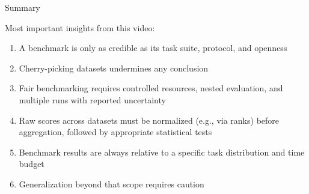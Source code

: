 \documentclass[main]{subfiles}
\begin{document}
\begin{frame}{Summary} 

Most important insights from this video:

\begin{enumerate}
    \item A benchmark is only as credible as its task suite, protocol, and openness
    \item Cherry-picking datasets undermines any conclusion
    \item Fair benchmarking requires controlled resources, nested evaluation, and multiple runs with reported uncertainty
    \item Raw scores across datasets must be normalized (e.g., via ranks) before aggregation, followed by appropriate statistical tests
    \item Benchmark results are always relative to a specific task distribution and time budget
    \item Generalization beyond that scope requires caution
\end{enumerate}

\end{frame}
\end{document}
